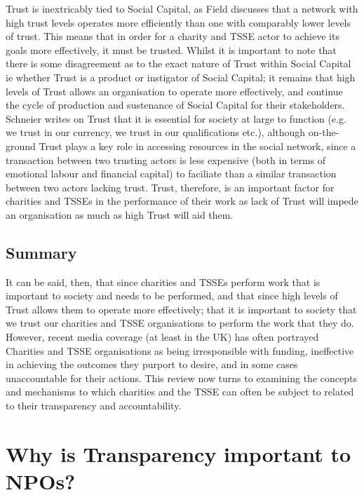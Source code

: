 Trust is inextricably tied to Social Capital, as Field discusses that a network with high trust levels operates more efficiently than one with comparably lower levels of trust. This means that in order for a charity and TSSE actor to achieve its goals more effectively, it must be trusted. Whilst it is important to note that there is some disagreement as to the exact nature of Trust within Social Capital ie whether Trust is a product or instigator of Social Capital; it remains that high levels of Trust allows an organisation to operate more effectively, and continue the cycle of production and sustenance of Social Capital for their stakeholders. Schneier writes on Trust that it is essential for society at large to function (e.g. we trust in our currency, we trust in our qualifications etc.), although on-the-ground Trust plays a key role in accessing resources in the social network, since a transaction between two trusting actors is less expensive (both in terms of emotional labour and financial capital) to faciliate than a similar transaction between two actors lacking trust. Trust, therefore, is an important factor for charities and TSSEs in the performance of their work as lack of Trust will impede an organisation as much as high Trust will aid them.


\subsection{Summary}
It can be said, then, that since charities and TSSEs perform work that is important to society and needs to be performed, and that since high levels of Trust allows them to operate more effectively; that it is important to society that we trust our charities and TSSE organisations to perform the work that they do. However, recent media coverage (at least in the UK) has often portrayed Charities and TSSE organisations as being irresponsible with funding, ineffective in achieving the outcomes they purport to desire, and in some cases unaccountable for their actions. This review now turns to examining the concepts and mechanisms to which charities and the TSSE can often be subject to related to their transparency and accountability.

\section{Why is Transparency important to NPOs?}

